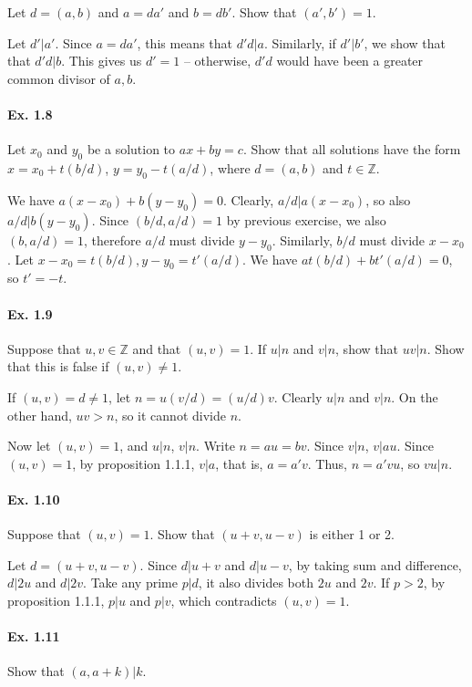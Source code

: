 \documentclass[notitlepage]{article}
\theoremstyle{definition}
\newcommand\Z{\mathbb{Z}}
\begin{document}
Let $d = (a, b)$ and $a = da'$ and $b = db'$. Show that $(a', b') = 1$.

Let $d' | a'$. Since $a = da'$, this means that $d'd | a$. Similarly,
if $d' | b'$, we show that that $d' d | b$. This gives us $d' = 1$ --
otherwise, $d' d$ would have been a greater common divisor of $a, b$.

\paragraph{Ex. 1.8}

Let $x_0$ and $y_0$ be a solution to $ax + by = c$. Show that all
solutions have the form $x = x_0 + t(b/d)$, $y = y_0 - t(a/d)$, where $d =
(a, b)$ and $t \in \Z$.

We have $a(x-x_0) + b(y-y_0) = 0$. Clearly, $a/d | a(x-x_0)$, so also
$a/d | b(y-y_0)$. Since $(b/d, a/d) = 1$ by previous exercise, we also
$(b, a/d) = 1$, therefore $a/d$ must divide $y-y_0$. Similarly, $b/d$
must divide $x-x_0$. Let $x-x_0 = t(b/d), y-y_0 = t'(a/d)$. We have
$at(b/d) + bt'(a/d) = 0$, so $t' = -t$.

\paragraph{Ex. 1.9}
Suppose that $u, v \in \Z$ and that $(u, v) = 1$. If $u | n$
and $v | n$, show that $uv | n$. Show that this is false if $(u, v) \ne 1$.

If $(u, v) = d \ne 1$, let $n = u (v/d) = (u/d) v$. Clearly $u | n$
and $v | n$. On the other hand, $uv > n$, so it cannot divide $n$.

Now let $(u, v) = 1$, and $u|n$, $v|n$. Write $n = au = bv$. Since
$v|n$, $v | au$. Since $(u, v) = 1$, by proposition 1.1.1, $v | a$,
that is, $a = a'v$. Thus, $n = a'vu$, so $vu | n$.

\paragraph{Ex. 1.10}
Suppose that $(u, v) = 1$. Show that $(u+v, u-v)$ is either 1 or 2.

Let $d = (u+v, u-v)$. Since $d | u+v$ and $d | u-v$, by taking sum and
difference, $d | 2u$ and $d | 2v$. Take any prime $p | d$, it also
divides both $2u$ and $2v$. If $p > 2$, by proposition 1.1.1, $p|u$
and $p|v$, which contradicts $(u, v) = 1$.

\paragraph{Ex. 1.11}
Show that $(a, a+k)|k$.
\end{document}
